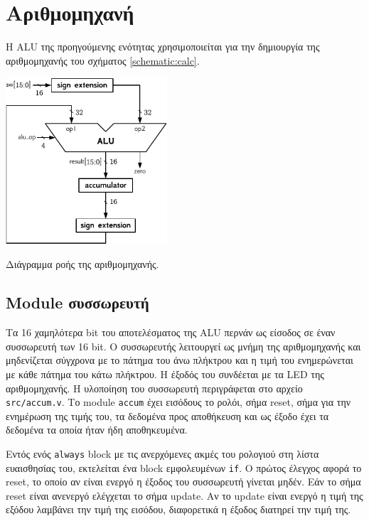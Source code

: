 \section{Αριθμομηχανή}

Η ALU της προηγούμενης ενότητας χρησιμοποιείται για την δημιουργία της αριθμομηχανής του σχήματος \ref{schematic:calc}.
\begin{circuitfig}[H]
	\centering
	\includegraphics[width=6cm]{schematics/calc.pdf}
	\caption{Διάγραμμα ροής της αριθμομηχανής.}
	\label{schematic:calc}
\end{circuitfig}

\subsection{Module συσσωρευτή}
Τα 16 χαμηλότερα bit του αποτελέσματος της ALU περνάν ως είσοδος σε έναν συσσωρευτή των 16 bit. Ο συσσωρευτής λειτουργεί ως μνήμη της αριθμομηχανής και μηδενίζεται σύγχρονα με το πάτημα του άνω πλήκτρου και η τιμή του ενημερώνεται με κάθε πάτημα του κάτω πλήκτρου. Η έξοδός του συνδέεται με τα LED της αριθμομηχανής. Η υλοποίηση του συσσωρευτή περιγράφεται στο αρχείο \texttt{src/accum.v}. Το module \texttt{accum} έχει εισόδους το ρολόι, σήμα reset, σήμα για την ενημέρωση της τιμής του, τα δεδομένα προς αποθήκευση και ως έξοδο έχει τα δεδομένα τα οποία ήταν ήδη αποθηκευμένα.\par
Εντός ενός \texttt{always} block με τις ανερχόμενες ακμές του ρολογιού στη λίστα ευαισθησίας του, εκτελείται ένα block εμφολευμένων \texttt{if}. Ο πρώτος έλεγχος αφορά το reset, το οποίο αν είναι ενεργό η έξοδος του συσσωρευτή γίνεται μηδέν. Εάν το σήμα reset είναι ανενεργό ελέγχεται το σήμα update. Αν το update είναι ενεργό η τιμή της εξόδου λαμβάνει την τιμή της εισόδου, διαφορετικά η έξοδος διατηρεί την τιμή της.\par

